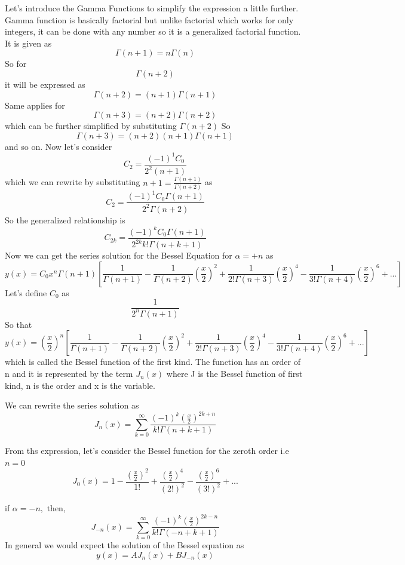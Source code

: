 Let's introduce the Gamma Functions to simplify the expression a little further. Gamma function is basically factorial but unlike factorial which works for only integers, it can be done with any number so it is a generalized factorial function. It is given as 
$$\Gamma(n + 1) = n \Gamma(n)$$
So for $$\Gamma(n + 2)$$ it will be expressed as $$\Gamma(n + 2) = (n + 1)\Gamma(n + 1)$$
Same applies for $$\Gamma(n + 3) = (n + 2)\Gamma(n + 2)$$ which can be further simplified by substituting $\Gamma(n + 2)$
So   $$\Gamma(n + 3) = (n + 2)(n + 1)\Gamma(n + 1)$$ and so on.
Now let's consider
$$C_2 = \frac{(-1)^1 C_0}{2^2(n + 1)}$$
which we can rewrite by substituting $ n + 1 = \frac{\Gamma(n + 1)}{\Gamma(n + 2)}$ as 
$$C_2 = \frac{(-1)^1 C_0 \Gamma(n + 1)}{2^2 \Gamma(n + 2)}$$
So the generalized relationship is 
$$C_{2k} =  \frac{(-1)^k C_0 \Gamma(n + 1)}{2^{2k} k! \Gamma(n + k + 1)}$$
Now we can get the series solution for the Bessel Equation for $\alpha= +n$ as 
\begin{dmath*}
y(x) = C_0 x^n \Gamma(n + 1) \left[\frac{1}{\Gamma(n + 1)} - \frac{1}{\Gamma(n+2)}\left(\frac{x}{2}\right)^2 +\frac{1}{2!\Gamma(n+3)}\left(\frac{x}{2}\right)^4 - \frac{1}{3!\Gamma(n+4)}\left(\frac{x}{2}\right)^6 + ... \right]
\end{dmath*}
Let's define $C_0$ as $$\frac{1}{2^n \Gamma(n + 1)}$$ So that
\begin{dmath*}
y(x) = (\frac{x}{2})^n \left[\frac{1}{\Gamma(n + 1)} - \frac{1}{\Gamma(n+2)}\left(\frac{x}{2}\right)^2 +\frac{1}{2!\Gamma(n+3)}\left(\frac{x}{2}\right)^4 - \frac{1}{3!\Gamma(n+4)}\left(\frac{x}{2}\right)^6 + ... \right]
\end{dmath*}
which is called the Bessel function of the first kind. The function has an order of n and it is represented by the term $J_n(x)$
where J is the Bessel function of first kind, n is the order and x is the variable.

We can rewrite the series solution as 
$$J_n(x) = \sum_{k = 0}^{\infty}\frac{(-1)^k (\frac{x}{2})^{2k + n}}{k! \Gamma(n + k + 1)}$$

From ths expression, let's consider the Bessel function for the zeroth order i.e $n=0$
$$J_0(x) = 1 - \frac{(\frac{x}{2})^2 }{1!} + \frac{(\frac{x}{2})^4 }{(2!)^2} - \frac{(\frac{x}{2})^6 }{(3!)^2} + ...$$

if $\alpha = -n,$ then,
\begin{equation}
J_{-n}(x) = \sum_{k = 0}^{\infty}\frac{(-1)^k (\frac{x}{2})^{2k - n}}{k! \Gamma(-n + k + 1)}
\label{eqn2}
\end{equation}
In general we would expect the solution of the Bessel equation as $$ y(x) = A J_n(x) + B J_{-n} (x)$$

